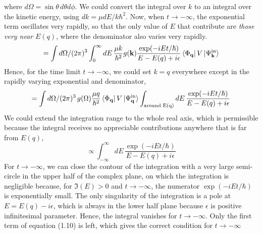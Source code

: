 \documentclass[12pt]{article}
\numberwithin{equation}{section}
\begin{document}
where $d\Omega = \sin\theta\,d\theta d\phi$. We could convert the integral over $k$ to an integral over the kinetic energy, using $dk = \mu dE/k\hbar^2$. Now, when $t\rightarrow-\infty$, the exponential term oscillates very rapidly, so that the only value of $E$ that contribute are \textit{those very near} $E(q)$, where the denominator also varies very rapidly.
\[=\int{d\Omega}/(2\pi)^3\int_{0}^{\infty}{dE\,\frac{\mu k}{\hbar^2}g(\mathbf{k})}\frac{\exp(-iEt/\hbar)}{E-E(q)+i\epsilon}\bra*{\Phi_{\mathbf{q}}}V\ket*{\Psi_{\mathbf{k}}^{\text{in}}}\]
Hence, for the time limit $t\rightarrow-\infty$, we could set $k = q$ everywhere except in the rapidly varying exponential and denominator,
\[=\int{d\Omega/(2\pi)^3\,g(\Omega)\frac{\mu q}{\hbar^2}}\bra*{\Phi_{\mathbf{q}}}V\ket*{\Psi_{\mathbf{q}}^{\text{in}}}\int_{\text{around E(q)}}{dE\,\frac{\exp(-iEt/\hbar)}{E-E(q)+i\epsilon}}\]
We could extend the integration range to the whole real axis, which is permissible because the integral receives no appreciable contributions anywhere that is far from $E(q)$,
\begin{equation}
    \varpropto \int_{-\infty}^{\infty}{dE\,\frac{\exp(-iEt/\hbar)}{E-E(q)+i\epsilon}}
\end{equation}
For $t\rightarrow-\infty$, we can close the contour of the integration with a very large semi-circle in the upper half of the complex plane, on which the integration is negligible because, for $\Im(E)>0$ and $t\rightarrow-\infty$, the numerator $\exp(-iEt/\hbar)$ is exponentially small. 
The only singularity of the integration is a pole at $E = E(q)-i\epsilon$, which is always in the lower half plane because $\epsilon$ is positive infinitesimal parameter.
Hence, the integral vanishes for $t\rightarrow-\infty$.
Only the first term of equation (1.10) is left, which gives the correct condition for $t\rightarrow-\infty$
\end{document}
